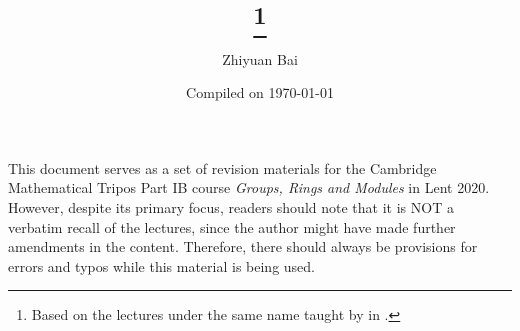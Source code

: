 \documentclass[a4paper]{article}
\title{\triposcourse{}
\thanks{Based on the lectures under the same name taught by \triposlecturer{} in \triposterm{}.}}
\author{Zhiyuan Bai}
\date{Compiled on \today}
\newcommand{\triposcourse}{Groups, Rings and Modules}
\newcommand{\triposterm}{Lent 2020}
\newcommand{\tripospart}{IB}
\theoremstyle{plain}
\theoremstyle{definition}
\theoremstyle{remark}
\begin{document}
    \maketitle
    This document serves as a set of revision materials for the Cambridge Mathematical Tripos Part \tripospart{} course \textit{\triposcourse{}} in \triposterm{}.
    However, despite its primary focus, readers should note that it is NOT a verbatim recall of the lectures, since the author might have made further amendments in the content.
    Therefore, there should always be provisions for errors and typos while this material is being used.
    \tableofcontents
    
    
    
    
    
    
    
    
    
    
    
    
    
    
    
    
    
\end{document}
